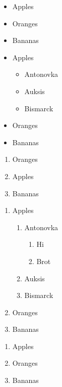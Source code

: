 \documentclass[12pt]{article}
\begin{document}
\begin{itemize}
	\item Apples 
	\item Oranges
	\item Bananas
\end{itemize}
\begin{itemize}
		\item Apples
		\begin{itemize}
			\item Antonovka
			\item Auksis
			\item Bismarck 
		\end{itemize}
		\item Oranges
		\item Bananas
	\end{itemize}

	\begin{enumerate}
		\item Oranges
		\item Apples
		\item Bananas
	\end{enumerate}


	\begin{enumerate}
	\item Apples
	\begin{enumerate}
		\item Antonovka
		\begin{enumerate}
			\item  Hi
			\item Brot
		\end{enumerate}
		\item Auksis
		\item Bismarck
	\end{enumerate}
	\item Oranges
	\item Bananas
\end{enumerate}


\begin{enumerate}[label=\Alph*]
	\item Apples
	\item Oranges
	\item Bananas
\end{enumerate}
\end{document}
